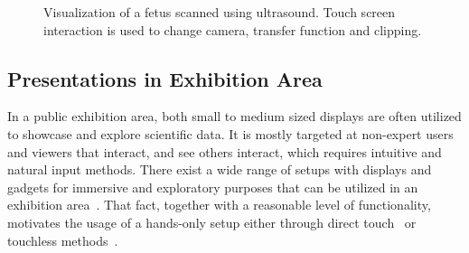 \documentclass[review,journal]{vgtc}         %
\begin{document}
%
%
%
%

\begin{figure}
	\centering
	\caption{Visualization of a fetus scanned using ultrasound. Touch screen interaction is used to change camera, transfer function and clipping.}
	\label{img:touch_workstation}
\end{figure}

\subsection{Presentations in Exhibition Area} \label{sec:exhibition}
In a public exhibition area, both small to medium sized displays are often utilized to showcase and explore scientific data.
It is mostly targeted at non-expert users and viewers that interact, and see others interact, which requires intuitive and natural input methods.
There exist a wide range of setups with displays and gadgets for immersive and exploratory purposes that can be utilized in an exhibition area~\cite{Laha:2013:VCB:2491367.2491368, conf/egve/KruszynskiL08}.
That fact, together with a reasonable level of functionality, motivates the usage of a hands-only setup either through direct touch~\cite{Klein:2012:DSD:2322389.2322403} or touchless methods~\cite{O'hara:2013:NTP:2442106.2442111}.
\end{document}
